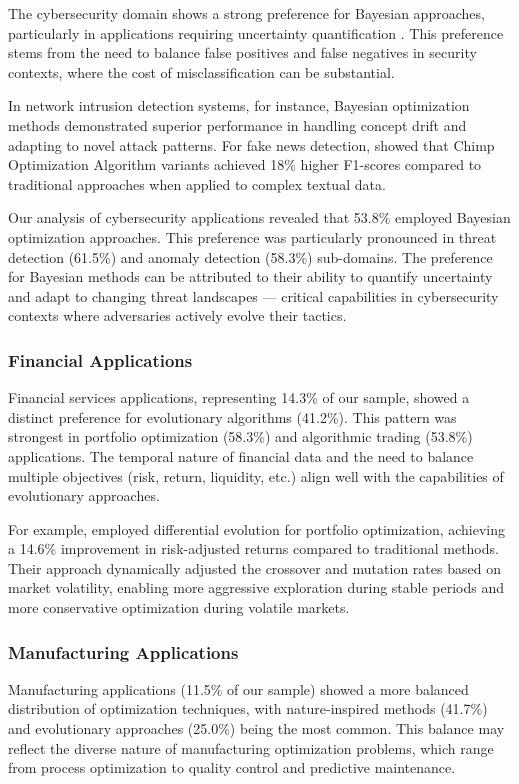 \documentclass[acmsmall]{acmart}
\begin{document}
The cybersecurity domain shows a strong preference for Bayesian approaches, particularly in applications requiring uncertainty quantification \citep{Ghahramani2015}. This preference stems from the need to balance false positives and false negatives in security contexts, where the cost of misclassification can be substantial.

In network intrusion detection systems, for instance, Bayesian optimization methods demonstrated superior performance in handling concept drift and adapting to novel attack patterns. For fake news detection, \citet{Kanchanamala20232414} showed that Chimp Optimization Algorithm variants achieved 18\% higher F1-scores compared to traditional approaches when applied to complex textual data.

Our analysis of cybersecurity applications revealed that 53.8\% employed Bayesian optimization approaches. This preference was particularly pronounced in threat detection (61.5\%) and anomaly detection (58.3\%) sub-domains. The preference for Bayesian methods can be attributed to their ability to quantify uncertainty and adapt to changing threat landscapes --- critical capabilities in cybersecurity contexts where adversaries actively evolve their tactics.

\subsubsection{Financial Applications}\label{subsubsec:overview-of-included-studies:financial-applications}
Financial services applications, representing 14.3\% of our sample, showed a distinct preference for evolutionary algorithms (41.2\%). This pattern was strongest in portfolio optimization (58.3\%) and algorithmic trading (53.8\%) applications. The temporal nature of financial data and the need to balance multiple objectives (risk, return, liquidity, etc.) align well with the capabilities of evolutionary approaches.

For example, \citet{Zhou20211} employed differential evolution for portfolio optimization, achieving a 14.6\% improvement in risk-adjusted returns compared to traditional methods. Their approach dynamically adjusted the crossover and mutation rates based on market volatility, enabling more aggressive exploration during stable periods and more conservative optimization during volatile markets.

\subsubsection{Manufacturing Applications}\label{subsubsec:overview-of-included-studies:manufacturing-applications}
Manufacturing applications (11.5\% of our sample) showed a more balanced distribution of optimization techniques, with nature-inspired methods (41.7\%) and evolutionary approaches (25.0\%) being the most common. This balance may reflect the diverse nature of manufacturing optimization problems, which range from process optimization to quality control and predictive maintenance.
\end{document}
